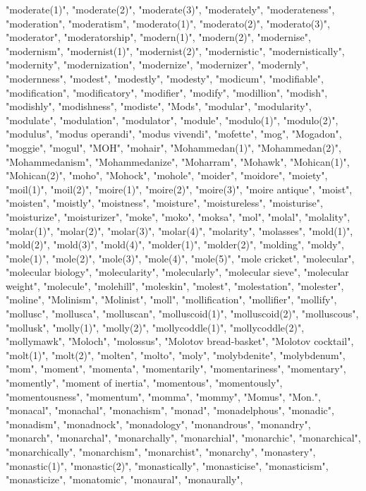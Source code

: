 "moderate(1)",
"moderate(2)",
"moderate(3)",
"moderately",
"moderateness",
"moderation",
"moderatism",
"moderato(1)",
"moderato(2)",
"moderato(3)",
"moderator",
"moderatorship",
"modern(1)",
"modern(2)",
"modernise",
"modernism",
"modernist(1)",
"modernist(2)",
"modernistic",
"modernistically",
"modernity",
"modernization",
"modernize",
"modernizer",
"modernly",
"modernness",
"modest",
"modestly",
"modesty",
"modicum",
"modifiable",
"modification",
"modificatory",
"modifier",
"modify",
"modillion",
"modish",
"modishly",
"modishness",
"modiste",
"Mods",
"modular",
"modularity",
"modulate",
"modulation",
"modulator",
"module",
"modulo(1)",
"modulo(2)",
"modulus",
"modus operandi",
"modus vivendi",
"mofette",
"mog",
"Mogadon",
"moggie",
"mogul",
"MOH",
"mohair",
"Mohammedan(1)",
"Mohammedan(2)",
"Mohammedanism",
"Mohammedanize",
"Moharram",
"Mohawk",
"Mohican(1)",
"Mohican(2)",
"moho",
"Mohock",
"mohole",
"moider",
"moidore",
"moiety",
"moil(1)",
"moil(2)",
"moire(1)",
"moire(2)",
"moire(3)",
"moire antique",
"moist",
"moisten",
"moistly",
"moistness",
"moisture",
"moistureless",
"moisturise",
"moisturize",
"moisturizer",
"moke",
"moko",
"moksa",
"mol",
"molal",
"molality",
"molar(1)",
"molar(2)",
"molar(3)",
"molar(4)",
"molarity",
"molasses",
"mold(1)",
"mold(2)",
"mold(3)",
"mold(4)",
"molder(1)",
"molder(2)",
"molding",
"moldy",
"mole(1)",
"mole(2)",
"mole(3)",
"mole(4)",
"mole(5)",
"mole cricket",
"molecular",
"molecular biology",
"molecularity",
"molecularly",
"molecular sieve",
"molecular weight",
"molecule",
"molehill",
"moleskin",
"molest",
"molestation",
"molester",
"moline",
"Molinism",
"Molinist",
"moll",
"mollification",
"mollifier",
"mollify",
"mollusc",
"mollusca",
"molluscan",
"molluscoid(1)",
"molluscoid(2)",
"molluscous",
"mollusk",
"molly(1)",
"molly(2)",
"mollycoddle(1)",
"mollycoddle(2)",
"mollymawk",
"Moloch",
"molossus",
"Molotov bread-basket",
"Molotov cocktail",
"molt(1)",
"molt(2)",
"molten",
"molto",
"moly",
"molybdenite",
"molybdenum",
"mom",
"moment",
"momenta",
"momentarily",
"momentariness",
"momentary",
"momently",
"moment of inertia",
"momentous",
"momentously",
"momentousness",
"momentum",
"momma",
"mommy",
"Momus",
"Mon.",
"monacal",
"monachal",
"monachism",
"monad",
"monadelphous",
"monadic",
"monadism",
"monadnock",
"monadology",
"monandrous",
"monandry",
"monarch",
"monarchal",
"monarchally",
"monarchial",
"monarchic",
"monarchical",
"monarchically",
"monarchism",
"monarchist",
"monarchy",
"monastery",
"monastic(1)",
"monastic(2)",
"monastically",
"monasticise",
"monasticism",
"monasticize",
"monatomic",
"monaural",
"monaurally",
